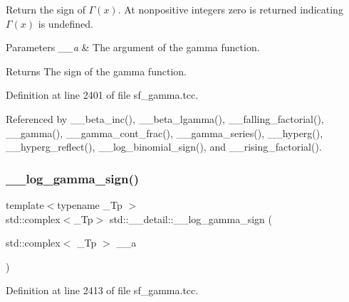 Return the sign of $ \Gamma(x) $. At nonpositive integers zero is returned indicating $ \Gamma(x) $ is undefined. 


\begin{DoxyParams}{Parameters}
{\em \+\_\+\+\_\+a} & The argument of the gamma function. \\
\hline
\end{DoxyParams}
\begin{DoxyReturn}{Returns}
The sign of the gamma function. 
\end{DoxyReturn}


Definition at line 2401 of file sf\+\_\+gamma.\+tcc.



Referenced by \+\_\+\+\_\+beta\+\_\+inc(), \+\_\+\+\_\+beta\+\_\+lgamma(), \+\_\+\+\_\+falling\+\_\+factorial(), \+\_\+\+\_\+gamma(), \+\_\+\+\_\+gamma\+\_\+cont\+\_\+frac(), \+\_\+\+\_\+gamma\+\_\+series(), \+\_\+\+\_\+hyperg(), \+\_\+\+\_\+hyperg\+\_\+reflect(), \+\_\+\+\_\+log\+\_\+binomial\+\_\+sign(), and \+\_\+\+\_\+rising\+\_\+factorial().

\mbox{\label{namespacestd_1_1____detail_a4c87b679d9fa1ac20ebe3cb85becb266}} 
\subsubsection{\texorpdfstring{\+\_\+\+\_\+log\+\_\+gamma\+\_\+sign()}{\_\_log\_gamma\_sign()}\hspace{0.1cm}{\footnotesize\ttfamily [2/2]}}
{\footnotesize\ttfamily template$<$typename \+\_\+\+Tp $>$ \\
std\+::complex$<$\+\_\+\+Tp$>$ std\+::\+\_\+\+\_\+detail\+::\+\_\+\+\_\+log\+\_\+gamma\+\_\+sign (\begin{DoxyParamCaption}\item[{std\+::complex$<$ \+\_\+\+Tp $>$}]{\+\_\+\+\_\+a }\end{DoxyParamCaption})}



Definition at line 2413 of file sf\+\_\+gamma.\+tcc.

\mbox{\label{namespacestd_1_1____detail_a48998bae6619c9f63574af354b205074}} 
